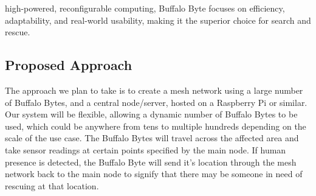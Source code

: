 \documentclass[10pt]{article}
\begin{document}
high-powered, reconfigurable computing, Buffalo Byte focuses on efficiency, adaptability, and real-world usability, making it the superior choice for search and rescue.
\subsection*{Proposed Approach}
The approach we plan to take is to create a mesh network using a large number of Buffalo Bytes, and a central node/server, hosted on a Raspberry Pi or similar. Our system will be flexible, allowing a dynamic number of Buffalo Bytes to be used, which could be anywhere from tens to multiple hundreds depending on the scale of the use case. The Buffalo Bytes will travel across the affected area and take sensor readings at certain points specified by the main node. If human presence is detected, the Buffalo Byte will send it's location through the mesh network back to the main node to signify that there may be someone in need of rescuing at that location.
\end{document}
